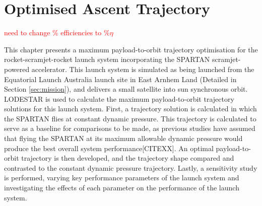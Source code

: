 
\cleardoublepage
\chapter{Optimised Ascent Trajectory}\label{chapter:Ascent}
\textcolor{red}{need to change \% efficiencies to \%$\eta$}

This chapter presents a maximum payload-to-orbit trajectory optimisation for the rocket-scramjet-rocket launch system incorporating the SPARTAN scramjet-powered accelerator. 
This launch system is simulated as being launched from the Equatorial Launch Australia launch site in East Arnhem Land (Detailed in Section \ref{sec:mission}), and delivers a small satellite into sun synchronous orbit. LODESTAR is used to calculate the maximum payload-to-orbit trajectory solutions for this launch system.
First, a trajectory solution is calculated in which the SPARTAN flies at constant dynamic pressure. This trajectory is calculated to serve as a baseline for comparisons to be made, as previous studies have assumed that flying the SPARTAN at its maximum allowable dynamic pressure would produce the best overall system performance[CITEXX]. An optimal payload-to-orbit trajectory is then developed, and the trajectory shape compared and contrasted to the constant dynamic pressure trajectory.
Lastly, a sensitivity study is performed, varying key performance parameters of the launch system and investigating the effects of each parameter on the performance of the launch system. 

